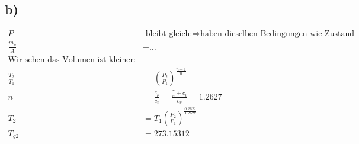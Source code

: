 

\subsection*{b)}
\begin{align*}
P &\text{ bleibt gleich:} \Rightarrow \text{haben dieselben Bedingungen wie Zustand 1} \\
\frac{m_g}{A} &+ \ldots \\
\text{Wir sehen das Volumen ist kleiner: aus Gas-Gesetz folgt} \\
\frac{T_2}{T_1} &= \left(\frac{P_2}{P_1}\right)^{\frac{n-1}{n}} \\
n &= \frac{c_p}{c_v} = \frac{\frac{\gamma}{n} + c_v}{c_v} = 1.2627 \\
T_2 &= T_1 \left(\frac{P_2}{P_1}\right)^{\frac{0.2627}{1.2627}} \\
T_{g2} &= 273.15312
\end{align*}